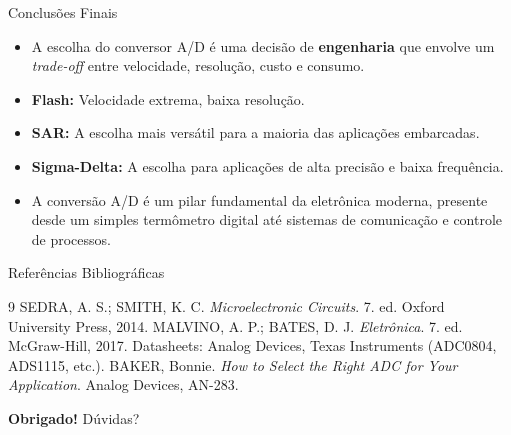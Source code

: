 \documentclass{beamer}
\begin{document}
\begin{frame}{Conclusões Finais}
    \begin{itemize}
        \item A escolha do conversor A/D é uma decisão de \textbf{engenharia} que envolve um \textit{trade-off} entre velocidade, resolução, custo e consumo.
        \item \textbf{Flash:} Velocidade extrema, baixa resolução.
        \item \textbf{SAR:} A escolha mais versátil para a maioria das aplicações embarcadas.
        \item \textbf{Sigma-Delta:} A escolha para aplicações de alta precisão e baixa frequência.
        \item A conversão A/D é um pilar fundamental da eletrônica moderna, presente desde um simples termômetro digital até sistemas de comunicação e controle de processos.
    \end{itemize}
\end{frame}

\begin{frame}{Referências Bibliográficas}
    \begin{thebibliography}{9}
         SEDRA, A. S.; SMITH, K. C. \textit{Microelectronic Circuits}. 7. ed. Oxford University Press, 2014.
         MALVINO, A. P.; BATES, D. J. \textit{Eletrônica}. 7. ed. McGraw-Hill, 2017.
         Datasheets: Analog Devices, Texas Instruments (ADC0804, ADS1115, etc.).
         BAKER, Bonnie. \textit{How to Select the Right ADC for Your Application}. Analog Devices, AN-283.
    \end{thebibliography}
\end{frame}

\begin{frame}{}
    \begin{center}
        \Huge{\textbf{Obrigado!}}
        \vspace{1cm}
        \Large{Dúvidas?}
    \end{center}
\end{frame}
\end{document}
